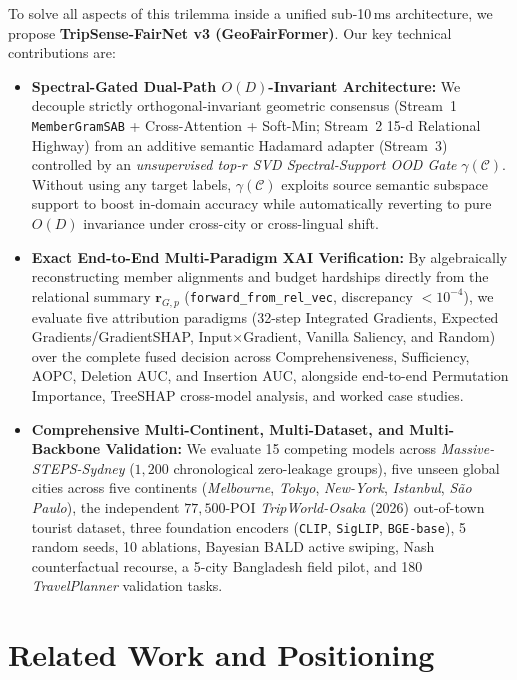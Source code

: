 \documentclass[final,5p,twocolumn]{elsarticle}
\begin{document}
To solve all aspects of this trilemma inside a unified sub-10\,ms architecture, we propose \textbf{TripSense-FairNet v3 (GeoFairFormer)}. Our key technical contributions are:
\begin{itemize}
    \item \textbf{Spectral-Gated Dual-Path $O(D)$-Invariant Architecture:} We decouple strictly orthogonal-invariant geometric consensus (Stream~1 \texttt{MemberGramSAB} + Cross-Attention + Soft-Min; Stream~2 15-d Relational Highway) from an additive semantic Hadamard adapter (Stream~3) controlled by an \emph{unsupervised top-$r$ SVD Spectral-Support OOD Gate} $\gamma(\mathcal{C})$. Without using any target labels, $\gamma(\mathcal{C})$ exploits source semantic subspace support to boost in-domain accuracy while automatically reverting to pure $O(D)$ invariance under cross-city or cross-lingual shift.
    \item \textbf{Exact End-to-End Multi-Paradigm XAI Verification:} By algebraically reconstructing member alignments and budget hardships directly from the relational summary $\mathbf{r}_{G,p}$ (\texttt{forward\_from\_rel\_vec}, discrepancy $<10^{-4}$), we evaluate five attribution paradigms (32-step Integrated Gradients, Expected Gradients/GradientSHAP, Input$\times$Gradient, Vanilla Saliency, and Random) over the complete fused decision across Comprehensiveness, Sufficiency, AOPC, Deletion AUC, and Insertion AUC, alongside end-to-end Permutation Importance, TreeSHAP cross-model analysis, and worked case studies.
    \item \textbf{Comprehensive Multi-Continent, Multi-Dataset, and Multi-Backbone Validation:} We evaluate 15 competing models across \textit{Massive-STEPS-Sydney} ($1{,}200$ chronological zero-leakage groups), five unseen global cities across five continents (\textit{Melbourne}, \textit{Tokyo}, \textit{New-York}, \textit{Istanbul}, \textit{S\~{a}o Paulo}), the independent $77{,}500$-POI \textit{TripWorld-Osaka} (2026) out-of-town tourist dataset, three foundation encoders (\texttt{CLIP}, \texttt{SigLIP}, \texttt{BGE-base}), 5 random seeds, 10 ablations, Bayesian BALD active swiping, Nash counterfactual recourse, a 5-city Bangladesh field pilot, and 180 \textit{TravelPlanner} validation tasks.
\end{itemize}

\section{Related Work and Positioning}
\label{sec:related}
\end{document}
